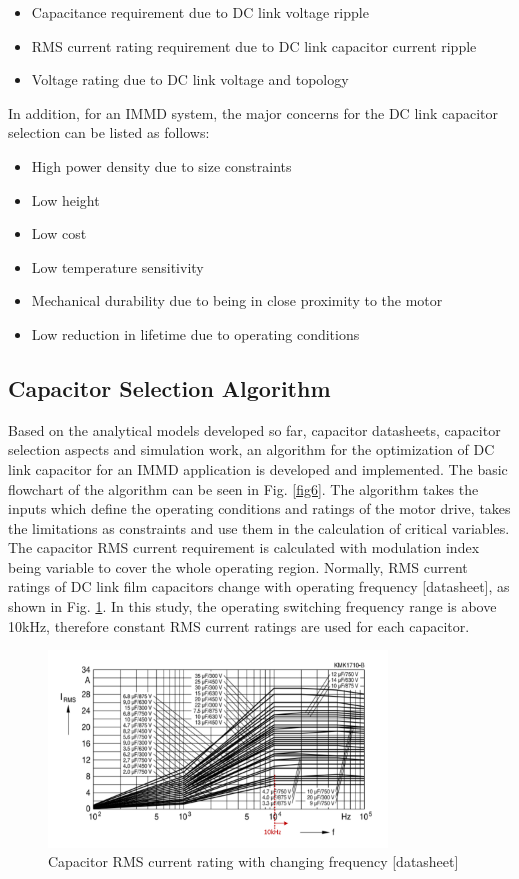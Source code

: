 \documentclass[conference,a4paper,twocolumn]{IEEEtran}
\begin{document}
\begin{itemize}
  \item Capacitance requirement due to DC link voltage ripple
  \item RMS current rating requirement due to DC link capacitor current ripple
  \item Voltage rating due to DC link voltage and topology
\end{itemize}

In addition, for an IMMD system, the major concerns for the DC link capacitor selection can be listed as follows:

\begin{itemize}
  \item High power density due to size constraints
  \item Low height
  \item Low cost
  \item Low temperature sensitivity
  \item Mechanical durability due to being in close proximity to the motor
  \item Low reduction in lifetime due to operating conditions
\end{itemize}


\subsection{Capacitor Selection Algorithm}

Based on the analytical models developed so far, capacitor datasheets, capacitor selection aspects and simulation work, an algorithm for the optimization of DC link capacitor for an IMMD application is developed and implemented. The basic flowchart of the algorithm can be seen in Fig. \ref{fig6}. The algorithm takes the inputs which define the operating conditions and ratings of the motor drive, takes the limitations as constraints and use them in the calculation of critical variables. The capacitor RMS current requirement is calculated with modulation index being variable to cover the whole operating region. Normally, RMS current ratings of DC link film capacitors change with operating frequency [datasheet], as shown in Fig. \ref{rms_f}. In this study, the operating switching frequency range is above 10kHz, therefore constant RMS current ratings are used for each capacitor.


\begin{figure}[h]
  \centering
  \includegraphics[width=9cm]{rms_f}
  \caption{Capacitor RMS current rating with changing frequency [datasheet]}
  \label{rms_f}
\end{figure}
\end{document}
